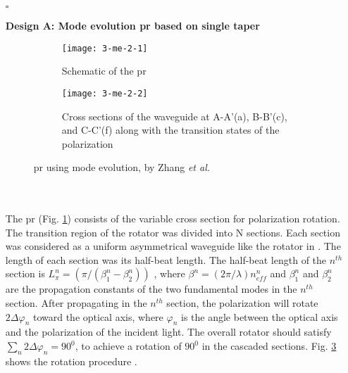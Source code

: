 \documentclass[../report.tex]{subfiles}
\begin{document}
\begin{itemize}[leftmargin=*]
	\item[$\square$] \begin{minipage}[t]{\textwidth}\textbf{Design A: Mode evolution \gls{pr} based on single taper}
	\begin{figure}[H] %
		\begin{subfigure}[t]{0.45\textwidth}
			\texttt{[image: 3-me-2-1]}
			\caption{Schematic of the \gls{pr}}
			\label{fig:3_me_2_1}
		\end{subfigure}
		\hfill
		\begin{subfigure}[t]{0.45\textwidth}
			\texttt{[image: 3-me-2-2]}
			\caption{Cross sections of the waveguide at A-A'(a), B-B'(c), and C-C'(f) along with the transition states of the polarization}
			\label{fig:3_me_2_2}
		\end{subfigure}
		\caption{\gls{pr} using mode evolution, by Zhang \textit{et al.} \cite{zhang_selected_2010}}
	\end{figure}
	\end{minipage}\\\\
	\noindent The \gls{pr} (Fig. \ref{fig:3_me_2_1}) consists of the  variable cross section for polarization rotation. The transition region of the rotator was divided into N sections. Each section was considered as a uniform asymmetrical waveguide like the rotator in \cite{wang_ultrasmall_2008}. The length of each section was its half-beat length. The half-beat length of the $n^{th}$ section is $L_{\pi }^{n}=\left( \pi  / \left( \beta _{1}^{n} - \beta _{2}^{n}\right) \right)$ , where $\beta ^{n}=\left( 2\pi / \lambda \right) n_{eff}^{n}$ and $\beta _{1}^{n}$ and $\beta _{2}^{n}$ are the propagation constants of the two fundamental modes in the $n^{th}$ section. After propagating in the $n^{th}$ section, the polarization will rotate $2\Delta \varphi _{n}$ toward the optical axis, where $\varphi _{n}$ is the angle between the optical axis and the polarization of the incident light. The overall rotator should satisfy $\sum _{n}2\Delta \varphi _{n}=90^{0}$, to achieve a rotation of $90^{0}$ in the cascaded sections. Fig. \ref{fig:3_me_2_2} shows the rotation procedure \cite{zhang_selected_2010}.
			

\end{itemize}
\end{document}
